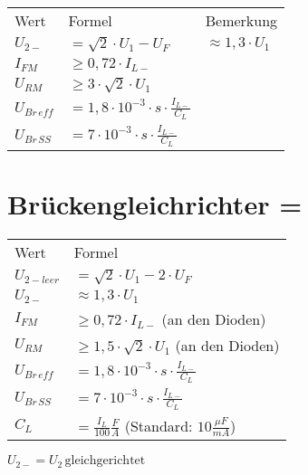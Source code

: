     \begin{table}[H]
        \begin{tabularx}{\columnwidth}{l l l}
            Wert            & Formel                                             & Bemerkung \\
            $U_{2-}$        & $=\sqrt{2}\cdot U_1-U_F$                           & $\approx 1,3\cdot U_1 $ \\
            $I_{FM}$        & $\geq 0,72\cdot I_{L-}$                            & \\
            $U_{RM}$        & $\geq 3\cdot \sqrt{2}\cdot U_1$                    & \\
            $U_{Br\, eff}$  & $=1,8\cdot 10^{-3}\cdot s\cdot\frac{I_{L-}}{C_L}$  & \\
            $U_{Br\, SS}$   & $=7\cdot 10^{-3}\cdot s\cdot\frac{I_{L-}}{C_L}$    & \\
        \end{tabularx}
    \end{table}

\section{Brückengleichrichter = }\label{sec:bruckengleichrichter}
    \begin{minipage}{0.5\columnwidth}
        \begin{table}[H]
            \begin{tabularx}{\columnwidth}{l l}
                Wert            & Formel \\
                $U_{2-leer}$    & $=\sqrt{2}\cdot U_1-2\cdot U_F$ \\
                $U_{2-}$        & $\approx 1,3\cdot U_1$ \\
                $I_{FM}$        & $\geq 0,72\cdot I_{L-}$ (an den Dioden) \\
                $U_{RM}$        & $\geq 1,5\cdot\sqrt{2}\cdot U_1$ (an den Dioden) \\
                $U_{Br\,eff}$   & $=1,8\cdot 10^{-3}\cdot s \cdot\frac{I_{L-}}{C_L}$ \\
                $U_{Br\,SS}$    & $=7\cdot 10^{-3}\cdot s \cdot\frac{I_{L-}}{C_L}$ \\
                $C_L$           & $=\frac{I_L}{100}\frac{F}{A}$ (Standard: $10\frac{\mu F}{mA}$)\\
            \end{tabularx}
        \end{table}
        $U_{2-}=U_2\,\text{gleichgerichtet}$ 
    \end{minipage}
    \begin{minipage}{0.5\columnwidth}
    \end{minipage}

